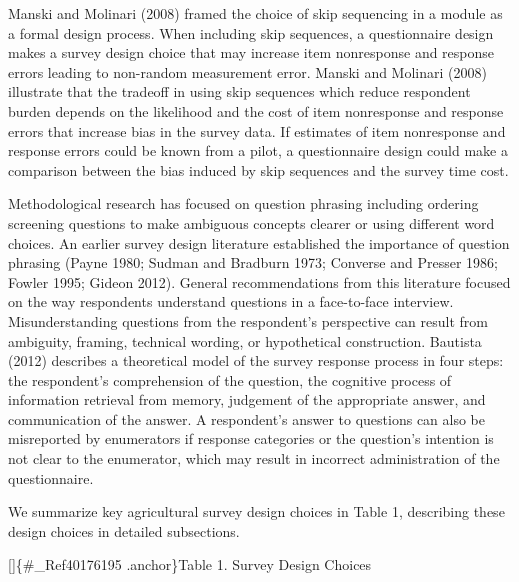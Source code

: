 \documentclass[
]{book}
\begin{document}
Manski and Molinari (2008) framed the choice of skip sequencing in a module as a formal design process. When including skip sequences, a questionnaire design makes a survey design choice that may increase item nonresponse and response errors leading to non-random measurement error. Manski and Molinari (2008) illustrate that the tradeoff in using skip sequences which reduce respondent burden depends on the likelihood and the cost of item nonresponse and response errors that increase bias in the survey data. If estimates of item nonresponse and response errors could be known from a pilot, a questionnaire design could make a comparison between the bias induced by skip sequences and the survey time cost.

Methodological research has focused on question phrasing including ordering screening questions to make ambiguous concepts clearer or using different word choices. An earlier survey design literature established the importance of question phrasing (Payne 1980; Sudman and Bradburn 1973; Converse and Presser 1986; Fowler 1995; Gideon 2012). General recommendations from this literature focused on the way respondents understand questions in a face-to-face interview. Misunderstanding questions from the respondent's perspective can result from ambiguity, framing, technical wording, or hypothetical construction. Bautista (2012) describes a theoretical model of the survey response process in four steps: the respondent's comprehension of the question, the cognitive process of information retrieval from memory, judgement of the appropriate answer, and communication of the answer. A respondent's answer to questions can also be misreported by enumerators if response categories or the question's intention is not clear to the enumerator, which may result in incorrect administration of the questionnaire.

We summarize key agricultural survey design choices in Table 1, describing these design choices in detailed subsections.

{[}{]}\{\#\_Ref40176195 .anchor\}Table 1. Survey Design Choices
\end{document}
